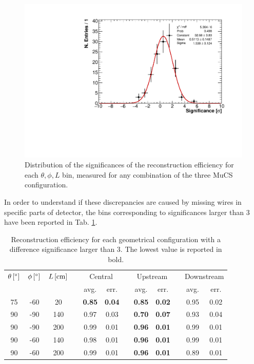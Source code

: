 \documentclass[a4paper]{scrartcl}
\renewcommand{\arraystretch}{1.2}
\newcommand{\ra}[1]{\renewcommand{\arraystretch}{#1}}
\begin{document}
\begin{figure}[htbp]
  \begin{center}
    \includegraphics[width=0.7\linewidth]{figures/significance.pdf}
    \caption{Distribution of the significances of the reconstruction efficiency for each $\theta,\phi,L$ bin, measured for any combination of the three MuCS configuration.} \label{fig:significance}
  \end{center}
\end{figure}

In order to understand if these discrepancies are caused by missing wires in specific parts of detector, the bins corresponding to significances larger than 3 have been reported in Tab. \ref{tab:significance}.

\begin{table}[htbp]
  \centering
  \ra{1.2}
  \begin{tabular}{cccccccccccc}
    \toprule
    $\theta\thinspace[^\circ]$ & $\phi\thinspace[^\circ]$ & $L\thinspace[\mathrm{cm}]$ & \phantom{a} & \multicolumn{2}{c}{Central} & \phantom{a} & \multicolumn{2}{c}{Upstream} & \phantom{a} & \multicolumn{2}{c}{Downstream}\\
     \cmidrule{5-6} \cmidrule{8-9} \cmidrule{11-12}
      &  &  & & avg. & err. & & avg. & err. & & avg. & err.   \\
    \midrule
    75 & -60 & 20 & & \textbf{0.85} & \textbf{0.04} & & \textbf{0.85} & \textbf{0.02} & & 0.95 & 0.02\\
    90 & -90 & 140 & & 0.97 & 0.03 & & \textbf{0.70} & \textbf{0.07} & & 0.93 & 0.04\\
    90 & -90 & 200 & & 0.99 & 0.01 & & \textbf{0.96} & \textbf{0.01} & & 0.99 & 0.01\\
    90 & -60 & 140 & & 0.98 & 0.01 & & \textbf{0.96} & \textbf{0.01} & & 0.99 & 0.01\\
    90 & -60 & 200 & & 0.99 & 0.01 & & \textbf{0.96} & \textbf{0.01} & & 0.89 & 0.01\\

    \bottomrule
  \end{tabular}
  \caption{Reconstruction efficiency for each geometrical configuration with a difference significance larger than 3. The lowest value is reported in bold.}\label{tab:significance}
\end{table}
\end{document}
